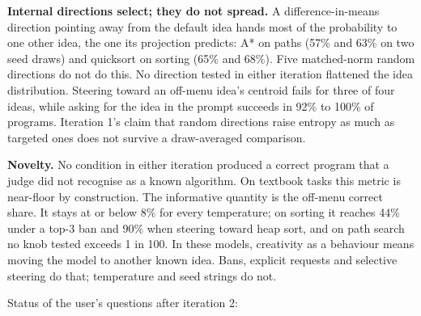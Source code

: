 \documentclass[11pt,letterpaper]{article}
\begin{document}
\textbf{Internal directions select; they do not spread.} A difference-in-means direction pointing away from the default idea hands most of the probability to one other idea, the one its projection predicts: A* on paths (57\% and 63\% on two seed draws) and quicksort on sorting (65\% and 68\%). Five matched-norm random directions do not do this. No direction tested in either iteration flattened the idea distribution. Steering toward an off-menu idea's centroid fails for three of four ideas, while asking for the idea in the prompt succeeds in 92\% to 100\% of programs. Iteration 1's claim that random directions raise entropy as much as targeted ones does not survive a draw-averaged comparison.

\textbf{Novelty.} No condition in either iteration produced a correct program that a judge did not recognise as a known algorithm. On textbook tasks this metric is near-floor by construction. The informative quantity is the off-menu correct share. It stays at or below 8\% for every temperature; on sorting it reaches 44\% under a top-3 ban and 90\% when steering toward heap sort, and on path search no knob tested exceeds 1 in 100. In these models, creativity as a behaviour means moving the model to another known idea. Bans, explicit requests and selective steering do that; temperature and seed strings do not.

Status of the user's questions after iteration 2:
\end{document}
